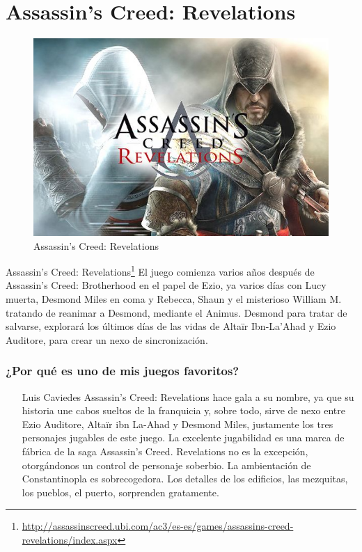 \section{Assassin's Creed: Revelations}

\begin{figure}[htbp]
\begin{center}
\includegraphics[width=.60\textwidth]{./imagenes/Revelations.jpg}
\caption{Assassin's Creed: Revelations}
\label{Assassin's Creed: Revelations}
\end{center}
\end{figure}
Assassin's Creed: Revelations\footnote{\url{http://assassinscreed.ubi.com/ac3/es-es/games/assassins-creed-revelations/index.aspx}} El juego comienza varios años después de Assassin's Creed: Brotherhood en el papel de Ezio, ya varios días con Lucy muerta, Desmond Miles en coma y Rebecca, Shaun y el misterioso William M. tratando de reanimar a Desmond, mediante el Animus. Desmond para tratar de salvarse, explorará los últimos días de las vidas de Altaïr Ibn-La'Ahad y Ezio Auditore, para crear un nexo de sincronización. 


\subsubsection{¿Por qué es uno de mis juegos favoritos?}
\begin{itemize}
\item[Luis Caviedes]Assassin’s Creed: Revelations hace gala a su nombre, ya que su historia une cabos sueltos de la franquicia y, sobre todo, sirve de nexo entre Ezio Auditore, Altaïr ibn La-Ahad y Desmond Miles, justamente los tres personajes jugables de este juego. La excelente jugabilidad es una marca de fábrica de la saga Assassin’s Creed. Revelations no es la excepción, otorgándonos un control de personaje soberbio. La ambientación de Constantinopla es sobrecogedora. Los detalles de los edificios, las mezquitas, los pueblos, el puerto, sorprenden gratamente. 
\end{itemize}